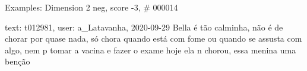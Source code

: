 \begin{frame}{Examples: Dimension 2 neg, score -3, \# 000014}
\footnotesize
\begin{alertblock}{text: t012981, user: a\_Latavanha, 2020-09-29}
Bella é tão calminha, não é de chorar por quase nada, só chora quando está com 
fome ou quando se assusta com algo, nem p tomar a vacina e fazer o exame hoje 
ela n chorou, essa menina uma benção 
\end{alertblock}
\end{frame}
